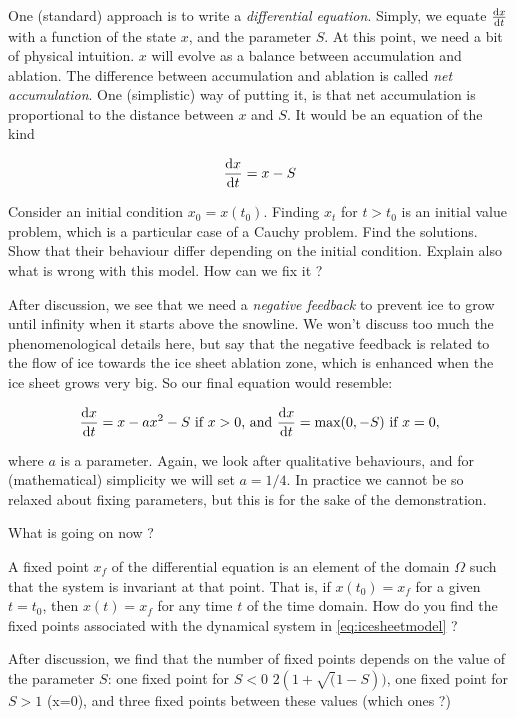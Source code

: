 One (standard) approach is to write a \emph{differential equation}.
Simply, we equate \(\frac{\mathop{}\!\mathrm{d} x}{\mathop{}\!\mathrm{d} t}\) with a function of the state \(x\), and the
parameter \(S\). At this point, we need a bit of physical intuition.
\(x\) will evolve as a balance between accumulation and ablation. The
difference between accumulation and ablation is called \emph{net
accumulation}. One (simplistic) way of putting it, is that net
accumulation is proportional to the distance between \(x\) and \(S\). It
would be an equation of the kind

\begin{equation}
\ddt x = x - S
\end{equation}

\bcd
Consider an initial condition \(x_0 = x(t_0)\). Finding \(x_t\) for
\(t>t_0\) is an initial value problem, which is a particular case of a
Cauchy problem. Find the solutions. Show that their behaviour differ
depending on the initial condition. Explain also what is wrong with this
model. How can we fix it ? \ecd

After discussion, we see that we need a \emph{negative feedback} to
prevent ice to grow until infinity when it starts above the snowline. We
won't discuss too much the phenomenological details here, but say that
the negative feedback is related to the flow of ice towards the ice
sheet ablation zone, which is enhanced when the ice sheet grows very
big. So our final equation would resemble:

\begin{equation}\label{eq:icesheetmodel}
\ddt x = x -  a x^2 - S\text{ if }x>0\text{, and }\dt x = \text{max}(0, -S)\text{ if }x=0, 
\end{equation}

where \(a\) is a parameter. Again, we look after qualitative behaviours,
and for (mathematical) simplicity we will set \(a=1/4\). In practice we
cannot be so relaxed about fixing parameters, but this is for the sake
of the demonstration.

What is going on now ?

\bcd
A fixed point \(x_f\) of the differential equation is an element of the
domain \(\Omega\) such that the system is invariant at that point. That
is, if \(x(t_0)=x_f\) for a given \(t=t_0\), then \(x(t)=x_f\) for any
time \(t\) of the time domain. How do you find the fixed points
associated with the dynamical system in \eqref{eq:icesheetmodel} ? \ecd 

After discussion, we find that the number of fixed points depends on the
value of the parameter \(S\): one fixed point for \(S<0\)
\(2(1+\sqrt(1-S))\), one fixed point for \(S>1\) (x=0), and three fixed
points between these values (which ones ?)

